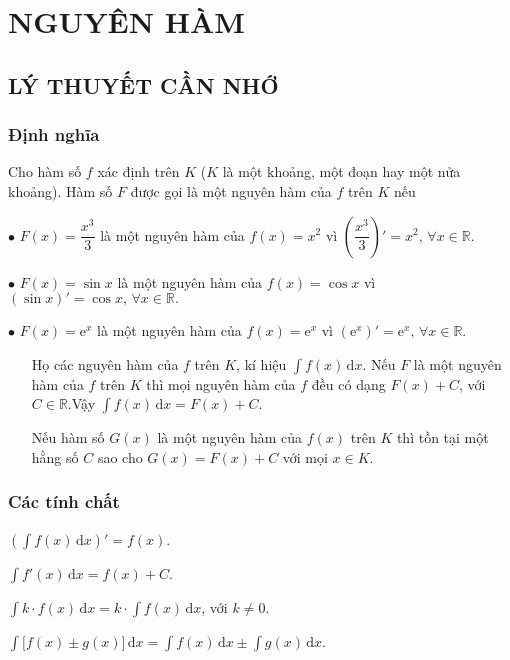 \section{NGUYÊN HÀM}
\subsection{LÝ THUYẾT CẦN NHỚ}
\subsubsection{Định nghĩa} Cho hàm số $f$ xác định trên $K$ ($K$ là một khoảng, một đoạn hay một nửa khoảng). Hàm số $F$ được gọi là một nguyên hàm của $f$ trên $K$ nếu 
\begin{luuy}
		\begin{listEX}[1]
			\item [$\bullet$] $F(x)=\dfrac{x^3}{3}$ là một nguyên hàm của $f(x)=x^2$ vì $\left( \dfrac{x^3}{3}\right)'=x^2,\,\forall x \in \mathbb{R}.$
			\item [$\bullet$] $F(x)=\sin x$ là một nguyên hàm của $f(x)=\cos x$ vì $\left(\sin x \right)'=\cos x,\,\forall x \in \mathbb{R}.$
			\item [$\bullet$] $F(x)=\mathrm{e}^x$ là một nguyên hàm của $f(x)=\mathrm{e}^x$ vì $\left(\mathrm{e}^x \right)'=\mathrm{e}^x,\,\forall x \in \mathbb{R}.$
		\end{listEX}
\end{luuy}
\begin{note}
	\begin{itemize}
		\item [\ding{172}] Họ các nguyên hàm của $f$ trên $K$, kí hiệu $\displaystyle\int f(x)\mathrm{\,d}x$. Nếu $F$ là một nguyên hàm của $f$ trên $K$ thì mọi nguyên hàm của $f$ đều có dạng $F(x)+C$, với $C \in \mathbb{R}$.Vậy	$\displaystyle\int f(x)\mathrm{\,d}x=F(x)+C.$
		\item [\ding{173}] Nếu hàm số $G(x)$ là một nguyên hàm của $f(x)$ trên $K$ thì tồn tại một hằng số $C$ sao cho $G(x)=F(x)+C$ với mọi $x \in K$.
	\end{itemize}
\end{note}
\subsubsection{Các tính chất}
\begin{boxkn}
\begin{listEX}[2]
	\item [\ding{172}] $\left(\displaystyle\int f(x)\mathrm{\,d}x \right)'=f(x)$.
	\item [\ding{173}] $\displaystyle\int f'(x)\mathrm{\,d}x =f(x)+C$.
	\item [\ding{174}] $ \displaystyle\int k \cdot f(x)\mathrm{\,d}x = k \cdot \displaystyle\int f(x)\mathrm{\,d}x$, với $k \ne 0$.
	\item [\ding{175}] $ \displaystyle\int \big[f(x) \pm g(x)\big]\mathrm{\,d}x = \displaystyle\int f(x)\mathrm{\,d}x\pm \displaystyle\int g(x)\mathrm{\,d}x$.
\end{listEX} 
\end{boxkn}

